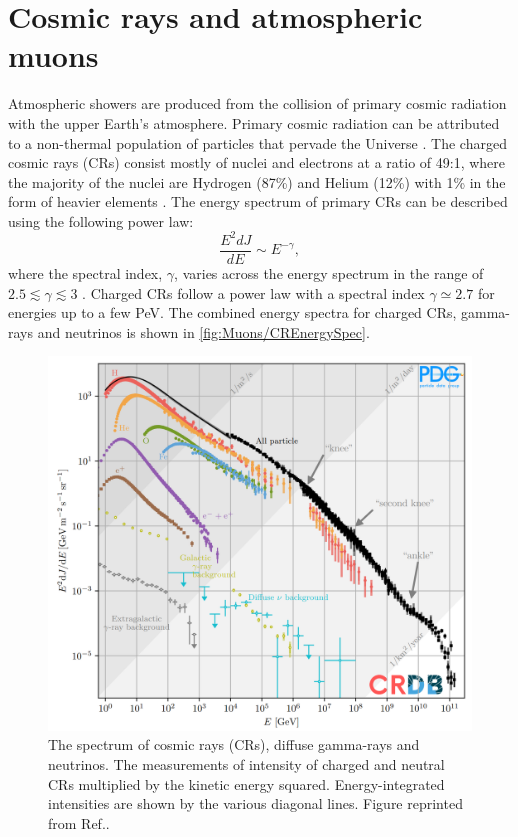 \section{Cosmic rays and atmospheric muons}\label{sec:Muons/CosmicRays}
Atmospheric showers are produced from the collision of primary cosmic radiation with the upper Earth's atmosphere. Primary cosmic radiation can be attributed to a non-thermal population of particles that pervade the Universe \cite{ParticleDataGroup:2024cfk}. The charged cosmic rays (CRs) consist mostly of nuclei and electrons at a ratio of 49:1, where the majority of the nuclei are Hydrogen (87\%) and Helium (12\%) with 1\% in the form of heavier elements \cite{Longair_2011}. The energy spectrum of primary CRs can be described using the following power law:
\begin{equation}\label{eqn:CREnergy}
    \frac{E^2dJ}{dE}\sim E^{-\gamma},
\end{equation}
where the spectral index, $\gamma$, varies across the energy spectrum in the range of $2.5\lesssim\gamma\lesssim3$ \cite{ParticleDataGroup:2024cfk}. Charged CRs follow a power law with a spectral index $\gamma\simeq2.7$ for energies up to a few PeV. The combined energy spectra for charged CRs, gamma-rays and neutrinos is shown in \autoref{fig:Muons/CREnergySpec}.
\begin{figure}[ht!]
    \centering
    \includegraphics[width=0.7\linewidth]{figures/Muons/CosmicRaySpectra.png}
    \caption{The spectrum of cosmic rays (CRs), diffuse gamma-rays and neutrinos. The measurements of intensity of charged and neutral CRs multiplied by the kinetic energy squared. Energy-integrated intensities are shown by the various diagonal lines. Figure reprinted from Ref.\cite{ParticleDataGroup:2024cfk}.}
    \label{fig:Muons/CREnergySpec}
\end{figure}
